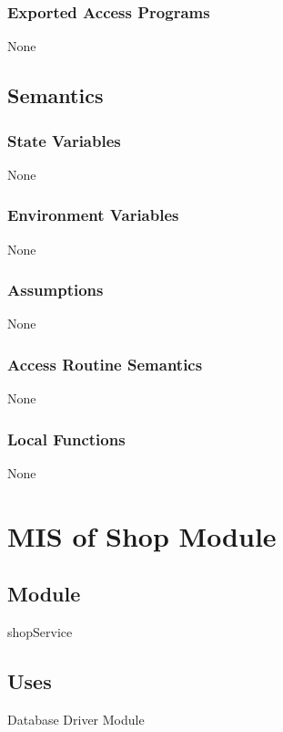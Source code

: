 \documentclass[12pt, titlepage]{article}
\begin{document}
\subsubsection{Exported Access Programs}

None
\subsection{Semantics}

\subsubsection{State Variables}

None

\subsubsection{Environment Variables}

None

\subsubsection{Assumptions}

None

\subsubsection{Access Routine Semantics}

None

\subsubsection{Local Functions}

None

\newpage
\section{MIS of Shop Module} \label{mShop}
\subsection{Module}

shopService

\subsection{Uses}

Database Driver Module
\end{document}
